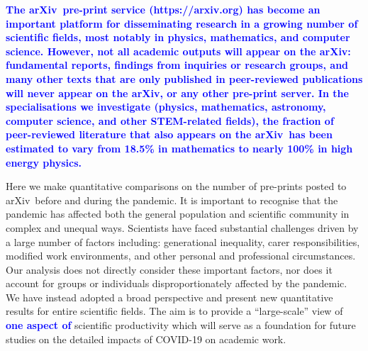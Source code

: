 \documentclass[]{rsos}%
\newcommand{\arxiv}{arXiv}
\newcommand{\change}[1]{\textcolor{blue}{\textbf{#1}}}
\begin{document}
\maketitle



\change{The \arxiv\ pre-print service\cite{Ginsparg:2011} ({https://arxiv.org}) has become an important platform for disseminating research in a growing number of scientific fields, most notably in physics, mathematics, and computer science. However, not all academic outputs will appear on the \arxiv: fundamental reports, findings from inquiries or research groups, and many other texts that are only published in peer-reviewed publications will never appear on the \arxiv, or any other pre-print server. In the specialisations we investigate (physics, mathematics, astronomy, computer science, and other STEM-related fields), the fraction of peer-reviewed literature that also appears on the \arxiv\ has been estimated to vary from 18.5\% in mathematics to nearly 100\% in high energy physics\cite{Davis:2007,GentilBeccot:2009}.}


 Here we make quantitative comparisons on the number of pre-prints posted to \arxiv\ before and during the pandemic. It is important to recognise that the pandemic has affected both the general population\cite{Nicola:2020,Chu:2020,IbnMohammed:2021} and scientific community\cite{Viglione:2020,Gewen:2020,King:2021} in complex and unequal ways. Scientists have faced substantial challenges driven by a large number of factors including: generational inequality, carer responsibilities, modified work environments, and other personal and professional circumstances. Our analysis does not directly consider these important factors, nor does it account for groups or individuals disproportionately affected by the pandemic. We have instead adopted a broad perspective and present new quantitative results for entire scientific fields. The aim is to provide a “large-scale” view of \change{one aspect of} scientific productivity which will serve as a foundation for future studies on the detailed impacts of COVID-19 on academic work.
\end{document}
